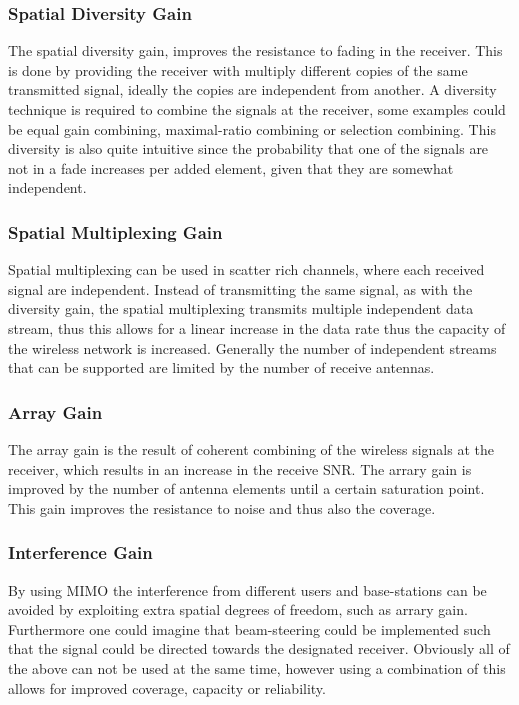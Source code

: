 \subsubsection{Spatial Diversity Gain}
The spatial diversity gain, improves the resistance to fading in the receiver. This is done by providing the receiver with multiply different copies of the same transmitted signal, ideally the copies are independent from another. A diversity technique is required to combine the signals at the receiver\cite{Ezio2007MIMO}, some examples could be equal gain combining, maximal-ratio combining or selection combining. This diversity is also quite intuitive since the probability that one of the signals are not in a fade increases per added element, given that they are somewhat independent. 
 
\subsubsection{Spatial Multiplexing Gain}
Spatial multiplexing can be used in scatter rich channels, where each received signal are independent. Instead of transmitting the same signal, as with the diversity gain, the spatial multiplexing transmits multiple independent data stream, thus this allows for a linear increase in the data rate thus the capacity of the wireless network is increased. Generally the number of independent streams that can be supported are limited by the number of receive antennas. 

\subsubsection{Array Gain}
The array gain is the result of coherent combining of the wireless signals at the receiver, which results in an increase in the receive SNR. The arrary gain is improved by the number of antenna elements until a certain saturation point. This gain improves the resistance to noise and thus also the coverage. 
  
\subsubsection{Interference Gain}
By using MIMO the interference from different users and base-stations can be avoided by exploiting extra spatial degrees of freedom, such as arrary gain. Furthermore one could imagine that beam-steering could be implemented such that the signal could be directed towards the designated receiver. Obviously all of the above can not be used at the same time, however using a combination of this allows for improved coverage, capacity or reliability.
 
